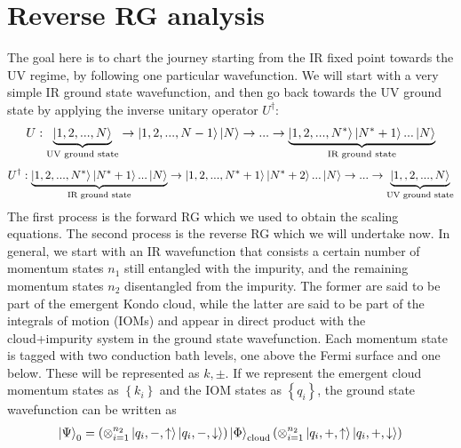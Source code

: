\documentclass{report}
\numberwithin{equation}{section}
\begin{document}
\section{Reverse RG analysis}\label{rev_rg}
The goal here is to chart the journey starting from the IR fixed point towards the UV regime, by following one particular wavefunction. We will start with a very simple IR ground state wavefunction, and then go back towards the UV ground state by applying the inverse unitary operator \(U^\dagger\):
\begin{equation*}\begin{aligned}
	U : \underbrace{\ket{1,2,...,N}}_\text{UV ground state} \rightarrow \ket{1,2,...,N-1}\ket{N} \rightarrow ... \rightarrow \underbrace{\ket{1,2,...,N^*}\ket{N^*+1}...\ket{N}}_\text{IR ground state}
\end{aligned}\end{equation*}
\begin{equation*}\begin{aligned}
	U^\dagger : \underbrace{\ket{1,2,...,N^*}\ket{N^*+1}...\ket{N}}_\text{IR ground state} \rightarrow \ket{1,2,...,N^*+1}\ket{N^*+2}...\ket{N} \rightarrow ... \rightarrow\underbrace{\ket{1,,2,...,N}}_\text{UV ground state}
\end{aligned}\end{equation*}
The first process is the forward RG which we used to obtain the scaling equations. The second process is the reverse RG which we will undertake now. In general, we start with an IR wavefunction that consists a certain number of momentum states \(n_1\) still entangled with the impurity, and the remaining momentum states \(n_2\) disentangled from the impurity. The former are said to be part of the emergent Kondo cloud, while the latter are said to be part of the integrals of motion (IOMs) and appear in direct product with the cloud+impurity system in the ground state wavefunction. Each momentum state is tagged with two conduction bath levels, one above the Fermi surface and one below. These will be represented as \(k,\pm\). If we represent the emergent cloud momentum states as \(\left\{k_i\right\} \) and the IOM states as \(\left\{q_i\right\}\), the ground state wavefunction can be written as 
\begin{equation}\begin{aligned}
	\ket{\Psi}_0 = \left(\otimes_{i=1}^{n_2}\ket{q_i,-,\uparrow}\ket{q_i,-,\downarrow}\right)\ket{\Phi}_\text{cloud}\left(\otimes_{i=1}^{n_2}\ket{q_i,+,\uparrow}\ket{q_i,+,\downarrow}\right)
\end{aligned}\end{equation}
\end{document}
